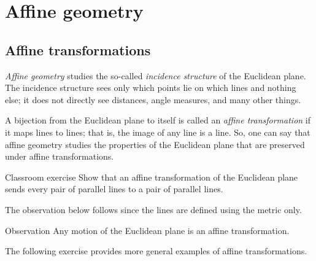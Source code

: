 
\chapter{Affine geometry}\label{chap:trans}

\section{Affine transformations}

\emph{Affine geometry} studies the so-called \emph{incidence structure} of the Euclidean plane.
The incidence structure sees only which points lie on which lines and nothing else;
it does not directly see distances, angle measures, and many other things.

A bijection from the Euclidean plane to itself is called an \emph{affine transformation} if it maps lines to lines;
that is, the image of any line is a line.
So, one can say that affine geometry studies the properties of the Euclidean plane that are preserved under affine transformations.

\begin{thm}{Classroom exercise}\label{ex:affine-par}
Show that an affine transformation of the Euclidean plane sends every pair of parallel lines to a pair of parallel lines.
\end{thm}

The observation below follows since the lines are defined using the metric only.

\begin{thm}{Observation}
Any motion of the Euclidean plane is an affine transformation.
\end{thm}

The following exercise provides more general examples of affine transformations.

